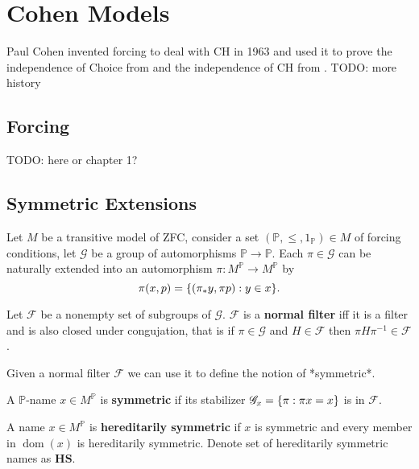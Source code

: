 \chapter{Cohen Models}

Paul Cohen invented forcing to deal with CH in 1963 and used it to prove the independence of Choice from \ZF and the independence of CH from \ZFC.
TODO: more history

\section{Forcing}

TODO: here or chapter 1?



\section{Symmetric Extensions}

\renewcommand*{\G}{\mathscr{G}}
\newcommand*{\dom}{\operatorname{dom}}
\renewcommand*{\P}{{\mathbb{P}}}
Let \(M\) be a transitive model of ZFC, consider a set \((\mathbb{P}, \leq, 1_{\mathbb{P}}) \in M\) of forcing conditions,
let \(\G\) be a group of automorphisms \(\mathbb{P} \to \mathbb{P}\).
Each \(\pi\in \G\) can be naturally extended into an automorphism \(\pi: M^{\mathbb{P}} \to M^{\mathbb{P}}\) by
\[ \pi(x,p) = {\left\{ (\pi_* y , \pi p ): y\in x \right\}}. \]

\begin{definition}
    Let \(\mathscr{F}\) be a nonempty set of subgroups of \(\G\).
    \(\mathscr{F}\) is a \textbf{normal filter} iff it is a filter and is also closed under congujation, that is
    if \(\pi\in \G\) and \(H\in\mathscr{F}\) then \(\pi H \pi^{-1} \in\mathscr{F}\).
\end{definition}
Given a normal filter \(\mathscr{F}\) we can use it to define the notion of *symmetric*.
\begin{definition}
    A \(\mathbb{P}\)-name \(x\in M^{\mathbb{P}}\) is \textbf{symmetric} if its stabilizer \(\G_x = \set{\pi: \pi x = x}\) is in \(\mathscr{F}\).

    A name \(x\in M^{\mathbb{P}}\) is \textbf{hereditarily symmetric} if \(x\) is symmetric and every member in \(\dom(x)\) is hereditarily symmetric.
    Denote set of hereditarily symmetric names as \(\mathbf{HS}\).
\end{definition}

